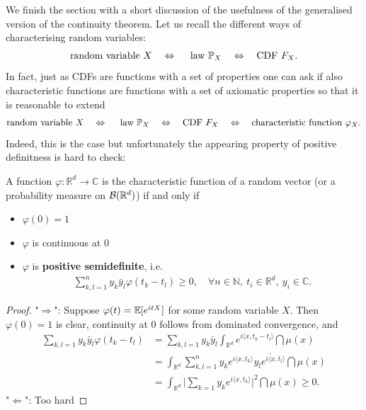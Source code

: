 We finish the section with a short discussion of the usefulness of the generalised version of the continuity theorem. Let us recall the different ways of characterising random variables: 
\begin{align*}
	\text{random variable }X\quad \Leftrightarrow \quad \text{ law }\P_X\quad \Leftrightarrow \quad \text{CDF }F_X.
\end{align*}
In fact, just as CDFs are functions with a set of properties one can ask if also characteristic functions are functions with a set of axiomatic properties so that it is reasonable to extend 
\begin{align*}
	\text{random variable }X\quad \Leftrightarrow \quad \text{ law }\P_X\quad \Leftrightarrow \quad \text{CDF }F_X\quad \Leftrightarrow\quad \text{characteristic function }\varphi_X.
\end{align*}
Indeed, this is the case but unfortunately the appearing property of positive definitness is hard to check:
\begin{lsatz}
\begin{theorem}[Bochner]
	A function $\varphi \colon \mathbb{R}^d \to \mathbb{C}$ is the characteristic function of a random vector (or a probability measure on $\mathcal B(\R^d)$) if and only if 
	\begin{itemize}
		\item $\varphi(0)=1$
		\item $\varphi$ is continuous at $0$
		\item $\varphi$ is \textbf{positive semidefinite}, i.e. 
		\begin{align*}
			\sum_{k,l=1}^{n} y_k \bar{y}_l \varphi(t_k - t_l) \geq 0, \quad \forall n \in \mathbb{N}, \: t_i \in \mathbb{R}^d, \: y_i \in \mathbb{C}.
		\end{align*}	
	\end{itemize}
\end{theorem}
\end{lsatz}
\begin{proof}[Proof]
	"$\Rightarrow$": Suppose $\varphi(t)=\E[e^{itX}]$ for some random variable $X$. Then $\varphi(0) = 1$ is clear, continuity at $0$ follows from dominated convergence, and
		\begin{align*}
			\sum_{k,l=1} y_k \bar{y}_l \varphi (t_k - t_l) &= \sum_{k,l=1} y_k \bar{y}_l \int_{\mathbb{R}^d} e^{i \langle x, t_k - t_l \rangle} \dint \mu(x) \\
				&= \int_{\mathbb{R}^d} \sum_{k,l=1}^n y_k e^{i \langle x ,t_k \rangle} \overline{y_l e^{i \langle x ,t_l \rangle}} \dint \mu(x) \\
				&= \int_{\mathbb{R}^d} \Big\lvert \sum_{k=1} y_k e^{i \langle x , t_k \rangle} \Big\rvert^2 \dint \mu(x) \geq 0.
		\end{align*}
	"$\Leftarrow$": Too hard
\end{proof}
